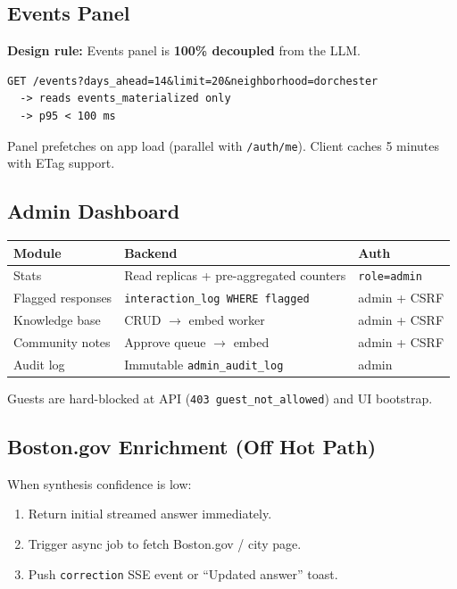\documentclass[11pt,a4paper]{article}
\begin{document}
\subsection{Events Panel}
\textbf{Design rule:} Events panel is \textbf{100\% decoupled} from the LLM.

\begin{lstlisting}
GET /events?days_ahead=14&limit=20&neighborhood=dorchester
  -> reads events_materialized only
  -> p95 < 100 ms
\end{lstlisting}

Panel prefetches on app load (parallel with \texttt{/auth/me}). Client caches 5 minutes with ETag support.

\subsection{Admin Dashboard}
\begin{table}[h]
\centering
\small
\begin{tabular}{@{}lll@{}}
\toprule
\textbf{Module} & \textbf{Backend} & \textbf{Auth} \\
\midrule
Stats & Read replicas + pre-aggregated counters & \texttt{role=admin} \\
Flagged responses & \texttt{interaction\_log WHERE flagged} & admin + CSRF \\
Knowledge base & CRUD $\rightarrow$ embed worker & admin + CSRF \\
Community notes & Approve queue $\rightarrow$ embed & admin + CSRF \\
Audit log & Immutable \texttt{admin\_audit\_log} & admin \\
\bottomrule
\end{tabular}
\end{table}

Guests are hard-blocked at API (\texttt{403 guest\_not\_allowed}) and UI bootstrap.

\subsection{Boston.gov Enrichment (Off Hot Path)}
When synthesis confidence is low:
\begin{enumerate}[noitemsep]
  \item Return initial streamed answer immediately.
  \item Trigger async job to fetch Boston.gov / city page.
  \item Push \texttt{correction} SSE event or ``Updated answer'' toast.
\end{enumerate}
\end{document}

